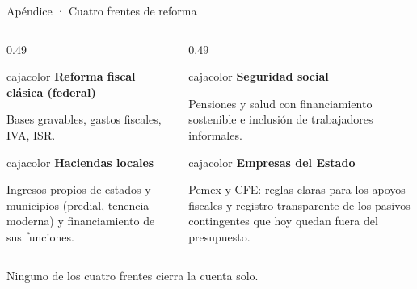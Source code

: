 \documentclass[aspectratio=169,10pt]{beamer}
\newcommand{\caja}[2]{%
  \begin{beamercolorbox}[wd=\linewidth,sep=5pt]{cajacolor}
    {\color{marino}\bfseries #1}\par\vspace{0.25em}\footnotesize #2
  \end{beamercolorbox}}
\begin{document}
\begin{frame}{Apéndice · Cuatro frentes de reforma}
  \vspace{0.3em}
  \begin{columns}[T,onlytextwidth]
    \begin{column}{0.49\textwidth}
      \caja{Reforma fiscal clásica (federal)}{Bases gravables, gastos fiscales, IVA, ISR.}\par\vspace{0.5em}
      \caja{Haciendas locales}{Ingresos propios de estados y municipios (predial, tenencia moderna) y financiamiento de sus funciones.}
    \end{column}
    \begin{column}{0.49\textwidth}
      \caja{Seguridad social}{Pensiones y salud con financiamiento sostenible e inclusión de trabajadores informales.}\par\vspace{0.5em}
      \caja{Empresas del Estado}{Pemex y CFE: reglas claras para los apoyos fiscales y registro transparente de los pasivos contingentes que hoy quedan fuera del presupuesto.}
    \end{column}
  \end{columns}
  \vspace{1.0em}
  {\small Ninguno de los cuatro frentes cierra la cuenta solo.\par}
\end{frame}
\end{document}

